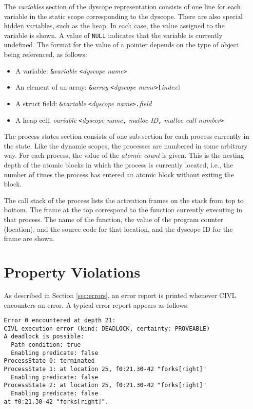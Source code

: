 The \emph{variables} section of the dyscope representation consists of
one line for each variable in the static scope corresponding to the
dyscope.  There are also special hidden variables, such as the heap.
In each case, the value assigned to the variable is shown.  A value of
\texttt{NULL} indicates that the variable is currently undefined.  The format for the
value of a pointer depends on the type of object being referenced, as 
follows:
\begin{itemize}
\item A variable: {\tt \&}\emph{variable} {\tt <}\emph{dyscope name}{\tt >}
\item An element of an array: {\tt \&}\emph{array} {\tt <}\emph{dyscope name}{\tt >[}\emph{index}{\tt]}
\item A struct field: {\tt \&}\emph{variable} {\tt <}\emph{dyscope name}{\tt >.}\emph{field}
\item A heap cell: \emph{variable} {\tt <}\emph{dyscope name}{\tt,} \emph{malloc ID}{\tt,} \emph{malloc call number}{\tt >}
\end{itemize}

The process states section consists of one sub-section for each
process currently in the state.  Like the dynamic scopes, the
processes are numbered in some arbitrary way. For each process, the
value of the \emph{atomic count} is given.  This is the nesting depth
of the atomic blocks in which the process is currently located, i.e.,
the number of times the process has entered an atomic block without
exiting the block.

The call stack of the process lists the activation frames on the stack
from top to bottom.  The frame at the top correspond to the function
currently executing in that process.  The name of the function, the
value of the program counter (location), and the source code for that
location, and the dyscope ID for the frame are shown.

\section{Property Violations}

As described in Section \ref{sec:errors}, an error report is printed
whenever CIVL encounters an error. A typical error report appears as
follows:
\begin{small}
\begin{verbatim}
Error 0 encountered at depth 21:
CIVL execution error (kind: DEADLOCK, certainty: PROVEABLE)
A deadlock is possible:
  Path condition: true
  Enabling predicate: false
ProcessState 0: terminated
ProcessState 1: at location 25, f0:21.30-42 "forks[right]"
  Enabling predicate: false
ProcessState 2: at location 25, f0:21.30-42 "forks[right]"
  Enabling predicate: false
at f0:21.30-42 "forks[right]".
\end{verbatim}
\end{small}

